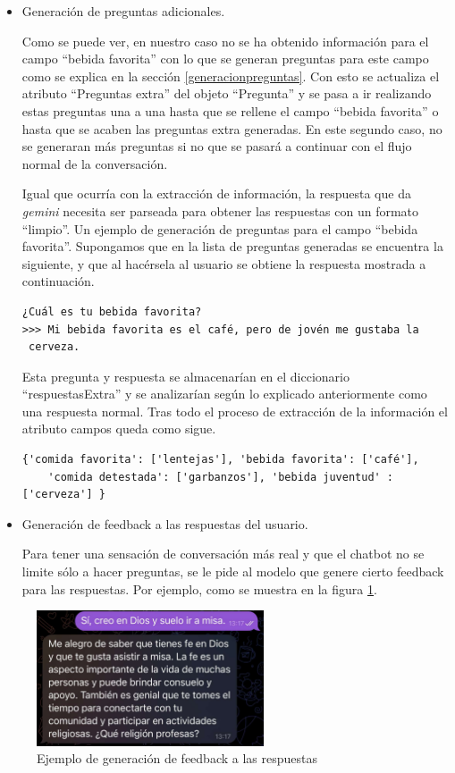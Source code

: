 \begin{itemize}
	\item Generación de preguntas adicionales.
	
	 Como se puede ver, en nuestro caso no se ha obtenido información para el campo ``bebida favorita'' con lo que se generan preguntas para este campo como se explica en la sección \ref{generacionpreguntas}. Con esto se actualiza el atributo ``Preguntas extra'' del objeto ``Pregunta'' y se pasa a ir realizando estas preguntas una a una hasta que se rellene el campo ``bebida favorita'' o hasta que se acaben las preguntas extra generadas. En este segundo caso, no se generaran más preguntas si no que se pasará a continuar con el flujo normal de la conversación. 
	
	Igual que ocurría con la extracción de información, la respuesta que da \textit{gemini} necesita ser parseada para obtener las respuestas con un formato ``limpio''. Un ejemplo de generación de preguntas para el campo ``bebida favorita''. Supongamos que en la lista de preguntas generadas se encuentra la siguiente, y que al hacérsela al usuario se obtiene la respuesta mostrada a continuación. 
	
\begin{verbatim}
¿Cuál es tu bebida favorita? 
>>> Mi bebida favorita es el café, pero de jovén me gustaba la
 cerveza.

\end{verbatim}

Esta pregunta y respuesta se almacenarían en el diccionario ``respuestasExtra'' y se analizarían según lo explicado anteriormente como una respuesta normal. Tras todo el proceso de extracción de la información el atributo campos queda como sigue. 

\begin{verbatim}
{'comida favorita': ['lentejas'], 'bebida favorita': ['café'], 
	'comida detestada': ['garbanzos'], 'bebida juventud' : ['cerveza'] }

\end{verbatim}
	 \item Generación de feedback a las respuestas del usuario.
	 
	  Para tener una sensación de conversación más real y que el chatbot no se limite sólo a hacer preguntas, se le pide al modelo que genere cierto feedback para las respuestas. Por ejemplo, como se muestra en la figura \ref{fig:feedback}.
\end{itemize}

\begin{figure}[h]
	\centering
	\includegraphics[width=0.6\textwidth]{Imagenes/feedback}
	\caption{Ejemplo de generación de feedback a las respuestas}
	\label{fig:feedback}
\end{figure}


